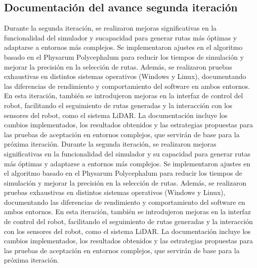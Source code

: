 \subsection{Documentaci\'on del avance segunda iteraci\'on}
    Durante la segunda iteraci\'on, se realizaron mejoras
        significativas en la funcionalidad del simulador y sucapacidad para generar rutas m\'as \'optimas y adaptarse a
        entornos m\'as complejos. Se implementaron ajustes en el
        algoritmo basado en el Physarum Polycephalum para reducir
        los tiempos de simulaci\'on y mejorar la precisi\'on en la
        selecci\'on de rutas. Adem\'as, se realizaron pruebas
        exhaustivas en distintos sistemas operativos (Windows y
        Linux), documentando las diferencias de rendimiento y
        comportamiento del software en ambos entornos.
    \vskip 0.5cm
    En esta iteraci\'on, tambi\'en se introdujeron mejoras en la
        interfaz de control del robot, facilitando el seguimiento de
        rutas generadas y la interacci\'on con los sensores del robot,
        como el sistema LiDAR. La documentaci\'on incluye los
        cambios implementados, los resultados obtenidos y las
        estrategias propuestas para las pruebas de aceptaci\'on en
        entornos complejos, que servir\'an de base para la pr\'oxima
        iteraci\'on.
    \vskip 0.5cm
    Durante la segunda iteraci\'on, se realizaron mejoras
        significativas en la funcionalidad del simulador y su
        capacidad para generar rutas m\'as \'optimas y adaptarse a
        entornos m\'as complejos. Se implementaron ajustes en el
        algoritmo basado en el Physarum Polycephalum para reducir
        los tiempos de simulaci\'on y mejorar la precisi\'on en la
        selecci\'on de rutas. Adem\'as, se realizaron pruebas
        exhaustivas en distintos sistemas operativos (Windows y
        Linux), documentando las diferencias de rendimiento y
        comportamiento del software en ambos entornos.
    \vskip 0.5cm
    En esta iteraci\'on, tambi\'en se introdujeron mejoras en la
        interfaz de control del robot, facilitando el seguimiento de
        rutas generadas y la interacci\'on con los sensores del robot,
        como el sistema LiDAR. La documentaci\'on incluye los
        cambios implementados, los resultados obtenidos y las
        estrategias propuestas para las pruebas de aceptaci\'on en
        entornos complejos, que servir\'an de base para la pr\'oxima
        iteraci\'on.